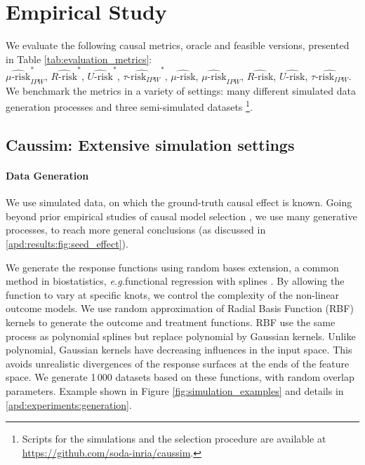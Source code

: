 \documentclass[11pt]{article}
\let\cite=\supercite
\newcommand{\eg}{\emph{e.g.}}
\begin{document}
\section{Empirical Study}\label{sec:empirical_study}


We evaluate the following causal metrics, oracle and feasible
versions, presented in Table
\ref{tab:evaluation_metrics}:\\
$\widehat{\mu\text{-risk}}_{IPW}^*$,
$\widehat{R\text{-risk}}^*$,
$\widehat{U\text{-risk}}^*$,
$\widehat{\tau\text{-risk}_{IPW}}^*$,
$\widehat{\mu\text{-risk}}$,
$\widehat{\mu\text{-risk}}_{IPW}$,
$\widehat{R\text{-risk}}$,
$\widehat{U\text{-risk}}$,
$\widehat{\tau\text{-risk}_{IPW}}$.
We benchmark the metrics in a variety of settings:
many different simulated data generation
processes and three semi-simulated datasets \footnote{Scripts for the simulations and the selection procedure are available at
    \url{https://github.com/soda-inria/caussim}.
}.

\subsection{Caussim: Extensive simulation settings}\label{subsec:simulations}

\paragraph{Data Generation}

We use simulated data, on which the ground-truth causal effect is known. Going
beyond prior empirical studies of causal model selection
\cite{schuler_comparison_2018,alaa_validating_2019}, we use many
generative processes, to reach more general conclusions (as discussed
in \ref{apd:results:fig:seed_effect}).

We generate the response functions using random bases extension, a common method
in biostatistics, \eg functional regression with splines
\cite{howe_splines_2011, perperoglou_review_2019}. By allowing the function to
vary at specific knots, we control the complexity of the non-linear outcome
models. We use random approximation of Radial Basis Function (RBF) kernels
\cite{rahimi_random_2008} to generate the outcome and treatment functions. RBF
use the same process as polynomial splines but replace polynomial by Gaussian
kernels. Unlike polynomial, Gaussian kernels have decreasing influences in the
input space. This avoids unrealistic divergences of the response surfaces at the
ends of the feature space. We generate 1\,000 datasets based on these functions,
with random overlap parameters. Example shown in Figure
\ref{fig:simulation_examples} and details in \ref{apd:experiments:generation}.
\end{document}
